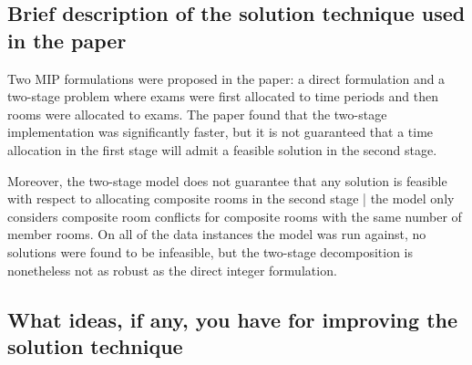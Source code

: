 \documentclass{article}
\begin{document}



\bigbreak
    
\subsection{Brief description of the solution technique used in the paper}

Two MIP formulations were proposed in the paper: a direct formulation and a two-stage problem where exams were first allocated to time periods and then rooms were allocated to exams. The paper found that the two-stage implementation was significantly faster, but it is not guaranteed that a time allocation in the first stage will admit a feasible solution in the second stage. \medbreak

Moreover, the two-stage model does not guarantee that any solution is feasible with respect to allocating composite rooms in the second stage | the model only considers composite room conflicts for composite rooms with the same number of member rooms. On all of the data instances the model was run against, no solutions were found to be infeasible, but the two-stage decomposition is nonetheless not as robust as the direct integer formulation.

\bigbreak

\subsection{What ideas, if any, you have for improving the solution technique}
\end{document}

